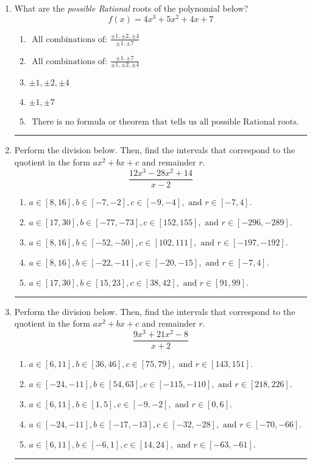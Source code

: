 \documentclass[14pt]{extbook}
\newcommand{\litem}[1]{\item#1\hspace*{-1cm}\rule{\textwidth}{0.4pt}}
\begin{document}
\begin{enumerate}
{\begin{enumerate}[label=\Alph*.]
\end{enumerate} }
\litem{
What are the \textit{possible Rational} roots of the polynomial below?\[ f(x) = 4x^{3} +5 x^{2} +4 x + 7 \]\begin{enumerate}[label=\Alph*.]
\item \( \text{ All combinations of: }\frac{\pm 1,\pm 2,\pm 4}{\pm 1,\pm 7} \)
\item \( \text{ All combinations of: }\frac{\pm 1,\pm 7}{\pm 1,\pm 2,\pm 4} \)
\item \( \pm 1,\pm 2,\pm 4 \)
\item \( \pm 1,\pm 7 \)
\item \( \text{ There is no formula or theorem that tells us all possible Rational roots.} \)

\end{enumerate} }
\litem{
Perform the division below. Then, find the intervals that correspond to the quotient in the form $ax^2+bx+c$ and remainder $r$.\[ \frac{12x^{3} -28 x^{2} + 14}{x -2} \]\begin{enumerate}[label=\Alph*.]
\item \( a \in [8, 16], b \in [-7, -2], c \in [-9, -4], \text{ and } r \in [-7, 4]. \)
\item \( a \in [17, 30], b \in [-77, -73], c \in [152, 155], \text{ and } r \in [-296, -289]. \)
\item \( a \in [8, 16], b \in [-52, -50], c \in [102, 111], \text{ and } r \in [-197, -192]. \)
\item \( a \in [8, 16], b \in [-22, -11], c \in [-20, -15], \text{ and } r \in [-7, 4]. \)
\item \( a \in [17, 30], b \in [15, 23], c \in [38, 42], \text{ and } r \in [91, 99]. \)

\end{enumerate} }
\litem{
Perform the division below. Then, find the intervals that correspond to the quotient in the form $ax^2+bx+c$ and remainder $r$.\[ \frac{9x^{3} +21 x^{2} -8}{x + 2} \]\begin{enumerate}[label=\Alph*.]
\item \( a \in [6, 11], b \in [36, 46], c \in [75, 79], \text{ and } r \in [143, 151]. \)
\item \( a \in [-24, -11], b \in [54, 63], c \in [-115, -110], \text{ and } r \in [218, 226]. \)
\item \( a \in [6, 11], b \in [1, 5], c \in [-9, -2], \text{ and } r \in [0, 6]. \)
\item \( a \in [-24, -11], b \in [-17, -13], c \in [-32, -28], \text{ and } r \in [-70, -66]. \)
\item \( a \in [6, 11], b \in [-6, 1], c \in [14, 24], \text{ and } r \in [-63, -61]. \)

\end{enumerate} }
\end{enumerate}
\end{document}
